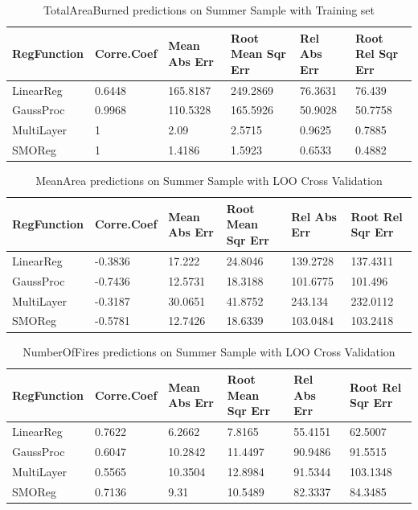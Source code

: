 \documentclass[runningheads]{llncs}
\begin{document}
\begin{table}[H]
\caption{TotalAreaBurned predictions on Summer Sample with Training set}\label{tab9}
\begin{tabular}{|l|l|l|l|l|l|}
\hline
RegFunction & Corre.\break Coef & Mean Abs Err & Root Mean Sqr Err & Rel Abs Err &Root Rel Sqr Err\\
\hline
LinearReg & 0.6448  & 165.8187 & 249.2869 & 76.3631 & 76.439  \\
GaussProc & 0.9968 & 110.5328 & 165.5926 & 50.9028 & 50.7758\\
MultiLayer & 1 & 2.09 & 2.5715 & 0.9625 & 0.7885\\
SMOReg & 1 & 1.4186 & 1.5923 & 0.6533 & 0.4882\\
\hline
\end{tabular}
\end{table}

\begin{table}[H]
\caption{MeanArea predictions on Summer Sample with LOO Cross Validation}\label{tab10}
\begin{tabular}{|l|l|l|l|l|l|}
\hline
RegFunction & Corre.\break Coef & Mean Abs Err & Root Mean Sqr Err & Rel Abs Err &Root Rel Sqr Err\\
\hline
LinearReg & -0.3836 & 17.222 & 24.8046 & 139.2728 & 137.4311  \\
GaussProc & -0.7436 & 12.5731 & 18.3188 & 101.6775 & 101.496 \\
MultiLayer & -0.3187  & 30.0651 & 41.8752 & 243.134 & 232.0112 \\
SMOReg & -0.5781 & 12.7426 & 18.6339 & 103.0484 & 103.2418 \\
\hline
\end{tabular}
\end{table}

\begin{table}[H]
\caption{NumberOfFires predictions on Summer Sample with LOO Cross Validation}\label{tab11}
\begin{tabular}{|l|l|l|l|l|l|}
\hline
RegFunction & Corre.\break Coef & Mean Abs Err & Root Mean Sqr Err & Rel Abs Err &Root Rel Sqr Err\\
\hline
LinearReg & 0.7622 & 6.2662 & 7.8165 & 55.4151 & 62.5007  \\
GaussProc & 0.6047 & 10.2842 & 11.4497 & 90.9486 & 91.5515 \\
MultiLayer & 0.5565  & 10.3504 & 12.8984 & 91.5344 & 103.1348 \\
SMOReg & 0.7136 & 9.31 & 10.5489 & 82.3337 & 84.3485\\
\hline
\end{tabular}
\end{table}
\end{document}
